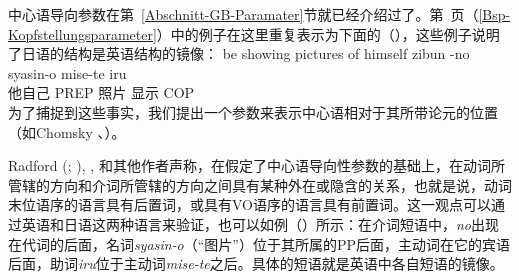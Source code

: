 \mbox{}%
中心语导向参数在第~\ref{Abschnitt-GB-Paramater}节就已经介绍过了。第~\pageref{Bsp-Kopfstellungsparameter}页（\ref{Bsp-Kopfstellungsparameter}）中的例子在这里重复表示为下面的（），这些例子说明了日语的结构是英语结构的镜像：
\eal
\label{Bsp-Kopfstellungsparameter-zwei}
\ex 
be showing pictures of himself
\ex
\gll zibun  -no syasin-o mise-te iru\\
     他自己 PREP 照片 显示 COP\\
\zl
为了捕捉到这些事实，我们提出一个参数来表示中心语相对于其所带论元的位置（如Chomsky \citeyear[]{Chomsky86}、\citeyear[]{Chomsky88a-u}）。

Radford (\citeyear[--61]{Radford90a-u}; \citeyear[--22]{Radford97a-u}), \citet[, 238]{Pinker94a}, \citet[]{Baker2003b}和其他作者声称，在假定了中心语导向性参数的基础上，在动词所管辖的方向和介词所管辖的方向之间具有某种外在或隐含的关系，也就是说，动词末位语序的语言具有后置词，或具有VO语序的语言具有前置词。这一观点可以通过英语和日语这两种语言来验证，也可以如例（）所示：在介词短语中，\emph{no}出现在代词的后面，名词\emph{syasin-o}（“图片”）位于其所属的PP后面，主动词在它的宾语后面，助词\emph{iru}位于主动词\emph{mise-te}之后。具体的短语就是英语中各自短语的镜像。

